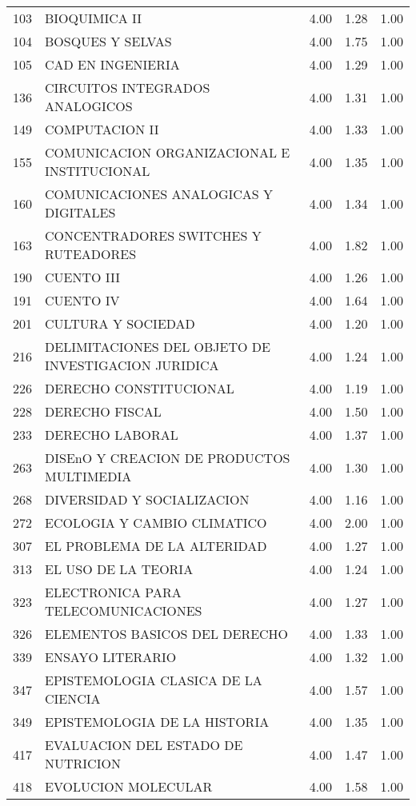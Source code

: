 \documentclass[12pt]{article}
\begin{document}
\begin{table}[ht]
\begin{tabular}{rlrrr}
  103 & BIOQUIMICA II & 4.00 & 1.28 & 1.00 \\ 
  104 & BOSQUES Y SELVAS & 4.00 & 1.75 & 1.00 \\ 
  105 & CAD EN INGENIERIA & 4.00 & 1.29 & 1.00 \\ 
  136 & CIRCUITOS INTEGRADOS ANALOGICOS & 4.00 & 1.31 & 1.00 \\ 
  149 & COMPUTACION II & 4.00 & 1.33 & 1.00 \\ 
  155 & COMUNICACION ORGANIZACIONAL E INSTITUCIONAL & 4.00 & 1.35 & 1.00 \\ 
  160 & COMUNICACIONES ANALOGICAS Y DIGITALES & 4.00 & 1.34 & 1.00 \\ 
  163 & CONCENTRADORES SWITCHES Y RUTEADORES & 4.00 & 1.82 & 1.00 \\ 
  190 & CUENTO III & 4.00 & 1.26 & 1.00 \\ 
  191 & CUENTO IV & 4.00 & 1.64 & 1.00 \\ 
  201 & CULTURA Y SOCIEDAD & 4.00 & 1.20 & 1.00 \\ 
  216 & DELIMITACIONES DEL OBJETO DE INVESTIGACION JURIDICA & 4.00 & 1.24 & 1.00 \\ 
  226 & DERECHO CONSTITUCIONAL & 4.00 & 1.19 & 1.00 \\ 
  228 & DERECHO FISCAL & 4.00 & 1.50 & 1.00 \\ 
  233 & DERECHO LABORAL & 4.00 & 1.37 & 1.00 \\ 
  263 & DISEnO Y CREACION DE PRODUCTOS MULTIMEDIA & 4.00 & 1.30 & 1.00 \\ 
  268 & DIVERSIDAD Y SOCIALIZACION & 4.00 & 1.16 & 1.00 \\ 
  272 & ECOLOGIA Y CAMBIO CLIMATICO & 4.00 & 2.00 & 1.00 \\ 
  307 & EL PROBLEMA DE LA ALTERIDAD & 4.00 & 1.27 & 1.00 \\ 
  313 & EL USO DE LA TEORIA & 4.00 & 1.24 & 1.00 \\ 
  323 & ELECTRONICA PARA TELECOMUNICACIONES & 4.00 & 1.27 & 1.00 \\ 
  326 & ELEMENTOS BASICOS DEL DERECHO & 4.00 & 1.33 & 1.00 \\ 
  339 & ENSAYO LITERARIO & 4.00 & 1.32 & 1.00 \\ 
  347 & EPISTEMOLOGIA CLASICA DE LA CIENCIA & 4.00 & 1.57 & 1.00 \\ 
  349 & EPISTEMOLOGIA DE LA HISTORIA & 4.00 & 1.35 & 1.00 \\ 
  417 & EVALUACION DEL ESTADO DE NUTRICION & 4.00 & 1.47 & 1.00 \\ 
  418 & EVOLUCION MOLECULAR & 4.00 & 1.58 & 1.00 \\ 

\end{tabular}
\end{table}
\end{document}
